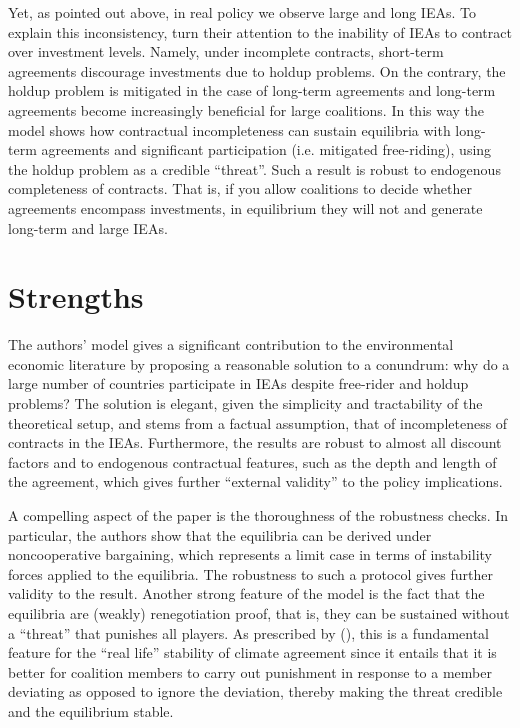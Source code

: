\documentclass[american]{scrartcl}
\newcommand{\citein}[1]{\citeauthor{#1} (\citeyear{#1})}
\begin{document}
Yet, as pointed out above, in real policy we observe large and long IEAs. To explain this inconsistency, \citeauthor{Battaglini2016} turn their attention to the inability of IEAs to contract over investment levels. Namely, under incomplete contracts, short-term agreements discourage investments due to holdup problems. On the contrary, the holdup problem is mitigated in the case of long-term agreements and long-term agreements become increasingly beneficial for large coalitions. In this way the model shows how contractual incompleteness can sustain equilibria with long-term agreements and significant participation (i.e. mitigated free-riding), using the holdup problem as a credible ``threat''. Such a result is robust to endogenous completeness of contracts. That is, if you allow coalitions to decide whether agreements encompass investments, in equilibrium they will not and generate long-term and large IEAs.

\section{Strengths}

The authors' model gives a significant contribution to the environmental economic literature by proposing a reasonable solution to a conundrum: why do a large number of countries participate in IEAs despite free-rider and holdup problems? The solution is elegant, given the simplicity and tractability of the theoretical setup, and stems from a factual assumption, that of incompleteness of contracts in the IEAs. Furthermore, the results are robust to almost all discount factors and to endogenous contractual features, such as the depth and length of the agreement, which gives further ``external validity'' to the policy implications.

A compelling aspect of the paper is the thoroughness of the robustness checks. In particular, the authors show that the equilibria can be derived under noncooperative bargaining, which represents a limit case in terms of instability forces applied to the equilibria. The robustness to such a protocol gives further validity to the result. Another strong feature of the model is the fact that the equilibria are (weakly) renegotiation proof, that is, they can be sustained without a ``threat'' that punishes all players. As prescribed by \citein{Barrett2005}, this is a fundamental feature for the ``real life'' stability of climate agreement since it entails that it is better for coalition members to carry out punishment in response to a member deviating as opposed to ignore the deviation, thereby making the threat credible and the equilibrium stable.
\end{document}
